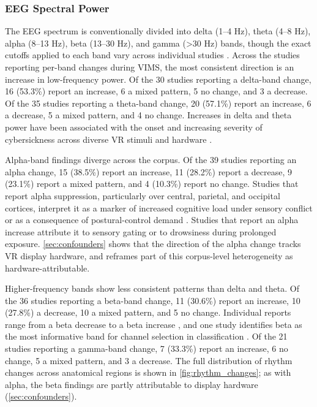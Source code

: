\subsubsection{EEG Spectral Power}
The EEG spectrum is conventionally divided into delta (1--4 Hz), theta (4--8 Hz), alpha (8--13 Hz), beta (13--30 Hz), and gamma (\textgreater 30 Hz) bands, though the exact cutoffs applied to each band vary across individual studies \cite{newsonEEGFrequencyBands2018}.
Across the studies reporting per-band changes during VIMS, the most consistent direction is an increase in low-frequency power.
Of the 30 studies reporting a delta-band change, 16 (53.3\%) report an increase, 6 a mixed pattern, 5 no change, and 3 a decrease.
Of the 35 studies reporting a theta-band change, 20 (57.1\%) report an increase, 6 a decrease, 5 a mixed pattern, and 4 no change.
Increases in delta and theta power have been associated with the onset and increasing severity of cybersickness across diverse VR stimuli and hardware \cite{krokosQuantifyingVRCybersickness2022, nurnbergerMismatchVisualVestibularInformation2021, kimCharacteristicChangesPhysiological2005, andrievskaiaExploringNeurophysiologicalCorrelates2023, jangEstimatingObjectiveEEG2022}.

Alpha-band findings diverge across the corpus.
Of the 39 studies reporting an alpha change, 15 (38.5\%) report an increase, 11 (28.2\%) report a decrease, 9 (23.1\%) report a mixed pattern, and 4 (10.3\%) report no change.
Studies that report alpha suppression, particularly over central, parietal, and occipital cortices, interpret it as a marker of increased cognitive load under sensory conflict or as a consequence of postural-control demand \cite{cortesEEGbasedExperimentVR2023, chenSpatialTemporalEEG2010, kimPsychophysiologicalChangesNavigation2001}.
Studies that report an alpha increase attribute it to sensory gating or to drowsiness during prolonged exposure.
\autoref{sec:confounders} shows that the direction of the alpha change tracks VR display hardware, and reframes part of this corpus-level heterogeneity as hardware-attributable.

Higher-frequency bands show less consistent patterns than delta and theta.
Of the 36 studies reporting a beta-band change, 11 (30.6\%) report an increase, 10 (27.8\%) a decrease, 10 a mixed pattern, and 5 no change.
Individual reports range from a beta decrease \cite{kimCharacteristicChangesPhysiological2005} to a beta increase \cite{suwandiExploringImpactMotion2024}, and one study identifies beta as the most informative band for channel selection in classification \cite{khoirunnisaaChannelSelectionEEGBased2018}.
Of the 21 studies reporting a gamma-band change, 7 (33.3\%) report an increase, 6 no change, 5 a mixed pattern, and 3 a decrease.
The full distribution of rhythm changes across anatomical regions is shown in \autoref{fig:rhythm_changes}; as with alpha, the beta findings are partly attributable to display hardware (\autoref{sec:confounders}).

